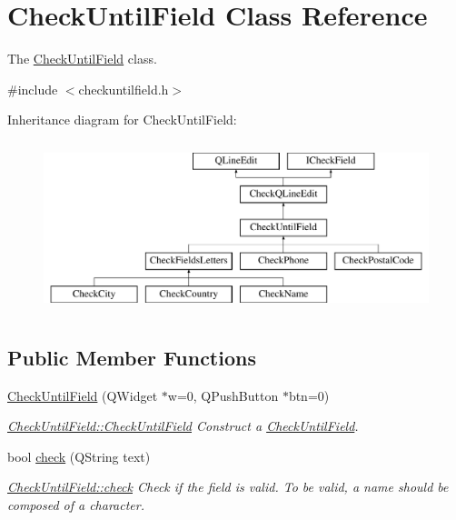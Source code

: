 \hypertarget{classCheckUntilField}{\section{Check\-Until\-Field Class Reference}
\label{classCheckUntilField}
}


The \hyperlink{classCheckUntilField}{Check\-Until\-Field} class.  




{\ttfamily \#include $<$checkuntilfield.\-h$>$}

Inheritance diagram for Check\-Until\-Field\-:\begin{figure}[H]
\begin{center}
\leavevmode
\includegraphics[height=5.000000cm]{dc/db9/classCheckUntilField}
\end{center}
\end{figure}
\subsection*{Public Member Functions}
\begin{DoxyCompactItemize}
\item 
\hyperlink{classCheckUntilField_a7b3789fe02959e488b35a0e79362f786}{Check\-Until\-Field} (Q\-Widget $\ast$w=0, Q\-Push\-Button $\ast$btn=0)
\begin{DoxyCompactList}\small\item\em \hyperlink{classCheckUntilField_a7b3789fe02959e488b35a0e79362f786}{Check\-Until\-Field\-::\-Check\-Until\-Field} Construct a \hyperlink{classCheckUntilField}{Check\-Until\-Field}. \end{DoxyCompactList}\item 
bool \hyperlink{classCheckUntilField_acfb9e2f95bebcb5b5d2337e3ac4f4d47}{check} (Q\-String text)
\begin{DoxyCompactList}\small\item\em \hyperlink{classCheckUntilField_acfb9e2f95bebcb5b5d2337e3ac4f4d47}{Check\-Until\-Field\-::check} Check if the field is valid. To be valid, a name should be composed of a character. \end{DoxyCompactList}\end{DoxyCompactItemize}
